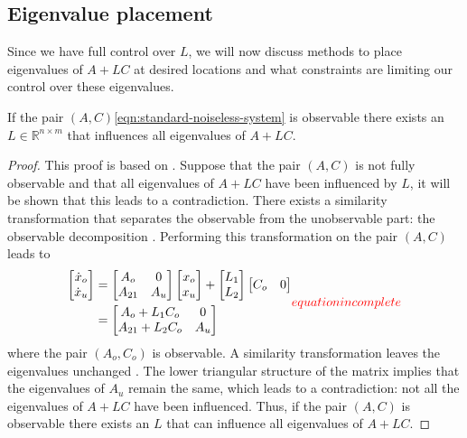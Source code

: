 \subsection{Eigenvalue placement}
Since we have full control over $L$, we will now discuss methods to place eigenvalues of $A+LC$ at desired locations and what constraints are limiting our control over these eigenvalues.

\begin{theorem}
\label{th:arbitrary-alc-eigenvalues}
    If the pair $(A,C)$\eqref{eqn:standard-noiseless-system} is observable there exists an $L \in \mathbb{R}^{n \times m}$ that influences all eigenvalues of $A+LC$.
\end{theorem}
\begin{proof}
    This proof is based on \cite[Section 4.2]{Antsaklis2006LinearProcessing}. Suppose that the pair $(A,C)$ is not fully observable and that all eigenvalues of $A+LC$  have been influenced by $L$, it will be shown that this leads to a contradiction. There exists a similarity transformation that separates the observable from the unobservable part: the observable decomposition \cite[Section 16.1]{Hespanha2018LinearTheory}. Performing this transformation on the pair $(A,C)$ leads to
    \begin{equation}
    \begin{split}
        \begin{bmatrix}
            \dot{x}_o \\
            \dot{x}_u
        \end{bmatrix}
        &=
        \begin{bmatrix}
            A_o & 0 \\
            A_{21} & A_u
        \end{bmatrix}
        \begin{bmatrix}
            x_o \\
            x_u
        \end{bmatrix}
        + 
        \begin{bmatrix}
            L_1 \\
            L_2
        \end{bmatrix}
        \begin{bmatrix}
            C_o & 0
        \end{bmatrix} \\
        &=
        \begin{bmatrix}
            A_o + L_1 C_o & 0 \\
            A_{21} + L_2 C_o & A_u
        \end{bmatrix}
    \end{split}
    \textcolor{red}{equation incomplete}
    \end{equation}  
where the pair $(A_o,C_o)$ is observable. A similarity transformation leaves the eigenvalues unchanged \cite[Section 5.2]{Lay2016LinearApplications}. The lower triangular structure of the matrix implies that the eigenvalues of $A_u$ remain the same, which leads to a contradiction: not all the eigenvalues of $A+LC$ have been influenced. Thus, if the pair $(A,C)$ is observable there exists an $L$ that can influence all eigenvalues of $A+LC$.
\end{proof}

